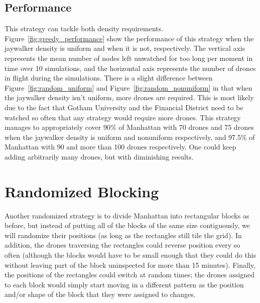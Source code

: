 \documentclass{article}
\begin{document}
\subsection{Performance}
\label{sub:greey_performance}
This strategy can tackle both density requirements. Figure~\ref{fig:greedy_performance} show the performance of this strategy when the jaywalker density is uniform and when it is not, respectively. The vertical axis represents the mean number of nodes left unwatched for too long per moment in time over 10 simulations, and the horizontal axis represents the number of drones in flight during the simulations. There is a slight difference between Figure~\ref{fig:random_uniform} and Figure~\ref{fig:random_nonuniform} in that when the jaywalker density isn't uniform, more drones are required. This is most likely due to the fact that Gotham University and the Financial District need to be watched so often that any strategy would require more drones. This strategy manages to appropriately cover 90\% of Manhattan with 70 drones and 75 drones when the jaywalker density is uniform and nonuniform respectively, and 97.5\% of Manhattan with 90 and more than 100 drones respectively. One could keep adding arbitrarily many drones, but with diminishing results.

\section{Randomized Blocking}
Another randomized strategy is to divide Manhattan into rectangular blocks as before, but instead of putting all of the blocks of the same size contiguously, we will randomize their positions (as long as the rectangles still tile the grid). In addition, the drones traversing the rectangles could reverse position every so often (although the blocks would have to be small enough that they could do this without leaving part of the block uninspected for more than 15 minutes). Finally, the positions of the rectangles could switch at random times; the drones assigned to each block would simply start moving in a different pattern as the position and/or shape of the block that they were assigned to changes.
\end{document}
